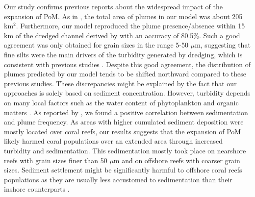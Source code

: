 \documentclass[preprint,12pt,authoryear]{elsarticle}
\begin{document}
Our study confirms previous reports about the widespread impact of the expansion of PoM. As in \cite{barnes2015sediment}, the total area of plumes in our model was about 205 km$^2$. Furthermore, our model reproduced the plume presence/absence within 15 km of the dredged channel derived by \cite{cunning2019extensive} with an accuracy of 80.5\%. Such a good agreement was only obtained for grain sizes in the range 5-50 $\mu$m, suggesting that fine silts were the main drivers of the turbidity generated by dredging, which is consistent with previous studies \citep{storlazzi2015influence,fourney2017additive}. Despite this good agreement, the distribution of plumes predicted by our model tends to be shifted northward compared to these previous studies. These discrepancies might be explained by the fact that our approaches is solely based on sediment concentration. However, turbidity depends on many local factors such as the water content of phytoplankton and organic matters \citep{gray2000comparability,thackston2000improved}. As reported by \cite{cunning2019extensive}, we found a positive correlation between sedimentation and plume frequency. As areas with higher cumulated sediment deposition were mostly located over coral reefs, our results suggests that the expansion of PoM likely harmed coral populations over an extended area through increased turbidity and sedimentation. This sedimentation mostly took place on nearshore reefs with grain sizes finer than 50 $\mu$m and on offshore reefs with coarser grain sizes. Sediment settlement might be significantly harmful to offshore coral reefs populations as they are usually less accustomed to sedimentation than their inshore  counterparts \citep{wolanski2005fine}.
\end{document}
